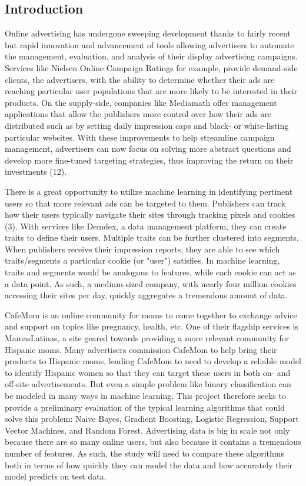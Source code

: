 \documentclass[a4paper]{article}
\begin{document}
\begin{multicols}{2}

\section*{Introduction}

Online advertising has undergone sweeping development thanks to fairly recent but rapid innovation and advancement of tools allowing advertisers to automate the management, evaluation, and analysis of their display advertising campaigns. Services like Nielsen Online Campaign Ratings for example, provide demand-side clients, the advertisers, with the ability to determine whether their ads are reaching particular user populations that are more likely to be interested in their products. On the supply-side, companies like Mediamath offer management applications that allow the publishers more control over how their ads are distributed such as by setting daily impression caps and black- or white-listing particular websites. With these improvements to help streamline campaign management, advertisers can now focus on solving more abstract questions and develop more fine-tuned targeting strategies, thus improving the return on their investments (12).


There is a great opportunity to utilize machine learning in identifying pertinent users so that more relevant ads can be targeted to them. Publishers can track how their users typically navigate their sites through tracking pixels and cookies (3). With services like Demdex, a data management platform, they can create traits to define their users. Multiple traits can be further clustered into segments. When publishers receive their impression reports, they are able to see which traits/segments a particular cookie (or "user") satisfies. In machine learning, traits and segments would be analogous to features, while each cookie can act as a data point. As such, a medium-sized company, with nearly four million cookies accessing their sites per day, quickly aggregates a tremendous amount of data.


CafeMom is an online community for moms to come together to exchange advice and support on topics like pregnancy, health, etc. One of their flagship services is MamasLatinas, a site geared towards providing a more relevant community for Hispanic moms. Many advertisers commission CafeMom to help bring their products to Hispanic moms, leading CafeMom to need to develop a reliable model to identify Hispanic women so that they can target these users in both on- and off-site advertisements. But even a simple problem like binary classification can be modeled in many ways in machine learning. This project therefore seeks to provide a preliminary evaluation of the typical learning algorithms that could solve this problem: Naive Bayes, Gradient Boosting, Logistic Regression, Support Vector Machines, and Random Forest. Advertising data is big in scale not only because there are so many online users, but also because it contains a tremendous number of features. As such, the study will need to compare these algorithms both in terms of how quickly they can model the data and how accurately their model predicts on test data.



\end{multicols}
\end{document}

